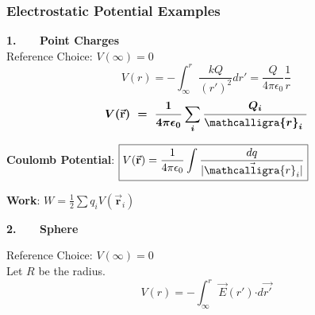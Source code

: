 \documentclass[12pt]{article}
\newcommand{\scripty}[1]{\ensuremath{\mathcalligra{#1}}}
\newcommand{\cursr}{\scripty{r}}		%
\newcommand{\dotP}{\boldsymbol \cdot}		%
\begin{document}
%
%
\newpage
\begin{landscape}

\subsubsection{Electrostatic Potential Examples}
\vspace{10pt}
\begin{minipage}[t]{0.5\textwidth}
	\textbf{1. \ \ \ Point Charges}\\[10pt]
	Reference Choice: \( V(\infty) = 0\)
	\[ V( r ) = - \int_{ \infty }^{r} \frac{k Q}{(r')^2} dr'
		= \frac{Q}{4 \pi \epsilon_0} \frac{1}{r} \]
	\[ \boldsymbol{ V(\vec{ \mathbf{r} }) \ 
		= \ \frac{1}{4 \pi \epsilon_0} \sum_i \frac{Q_i}{\cursr_i \ } } \]
	
	\vspace{20pt}
	\textbf{Coulomb Potential}: \indent 
	\( \displaystyle \boxed{ V(\vec{ \mathbf{r} }) 
		= \frac{1}{4 \pi \epsilon_0} \int \frac{dq}{| \vec{\cursr_i} |} }\)

	\vspace{20pt}
	\textbf{Work}: \indent 
	\( \displaystyle \boxed{ W = \frac{1}{2} \sum q_i V(\vec{ \mathbf{r} }_i) } \)
\end{minipage}

\vspace{30pt}
\begin{minipage}[t]{.61\textwidth}
	\textbf{2. \ \ \ Sphere}

	\vspace{15pt}
	Reference Choice:  \( V(\infty) = 0\)\\[15pt]
	Let \(R\) be the radius.
	\[ V(r) = - \int_{\infty}^r \vec{E}(r') \dotP d\vec{r'} \]


\end{minipage}
\end{landscape}
\end{document}
